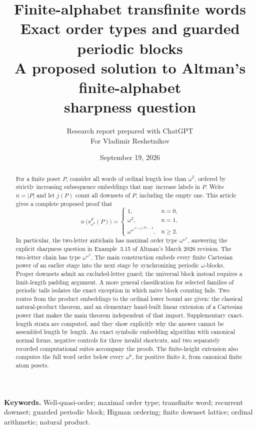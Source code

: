 \documentclass[11pt,a4paper]{article}
\title{\vspace{-10mm}\color{ink}\LARGE\bfseries
Finite-alphabet transfinite words\\[2mm]
Exact order types and guarded periodic blocks\\[3mm]
\large A proposed solution to Altman's finite-alphabet\\sharpness question}
\author{Research report prepared with ChatGPT\\
\small For Vladimir Reshetnikov}
\date{September 19, 2026}
\numberwithin{equation}{section}
\theoremstyle{definition}
\theoremstyle{remark}
\newcommand{\mot}{\mathop{o}}
\newcommand{\Wordspace}[1]{s_{\omega^2}^{F}(#1)}
\begin{document}
\maketitle
\thispagestyle{empty}
\begin{abstract}
For a finite poset $P$, consider all words of ordinal length less than
$\omega^2$, ordered by strictly increasing subsequence embeddings that may
increase labels in $P$. Write $n=|P|$ and let $j(P)$ count all downsets of
$P$, including the empty one. This article gives a complete proposed proof
that
\[
  \mot\bigl(\Wordspace P\bigr)=
  \begin{cases}
    1,&n=0,\\
    \omega^2,&n=1,\\
    \omega^{\omega^{\,n+j(P)-2}},&n\ge2.
  \end{cases}
\]
In particular, the two-letter antichain has maximal order type
$\omega^{\omega^4}$, answering the explicit sharpness question in
Example~3.15 of Altman's March 2026 revision. The two-letter chain has type
$\omega^{\omega^3}$. The main construction embeds every finite Cartesian
power of an earlier stage into the next stage by synchronizing periodic
$\omega$-blocks. Proper downsets admit an excluded-letter guard; the universal
block instead requires a limit-length padding argument. A more general
classification for selected families of periodic tails isolates the exact
exception in which naive block counting fails. Two routes from the product
embeddings to the ordinal lower bound are given: the classical natural-product
theorem, and an elementary hand-built linear extension of a Cartesian power
that makes the main theorem independent of that import. Supplementary
exact-length strata are computed, and they show explicitly why the answer
cannot be assembled length by length. An exact symbolic embedding algorithm
with canonical normal forms, negative controls for three invalid shortcuts,
and two separately recorded computational suites accompany the proofs.
The finite-height extension also computes the full word order below every
$\omega^k$, for positive finite $k$, from canonical finite atom posets.
\end{abstract}



\vfill
\noindent\small\textbf{Keywords.} Well-quasi-order; maximal order type;
transfinite word; recurrent downset; guarded periodic block; Higman ordering;
finite downset lattice; ordinal arithmetic; natural product.
\newpage
\begingroup
\small
\setlength{\parskip}{0pt}
\tableofcontents
\endgroup
\newpage
\end{document}

